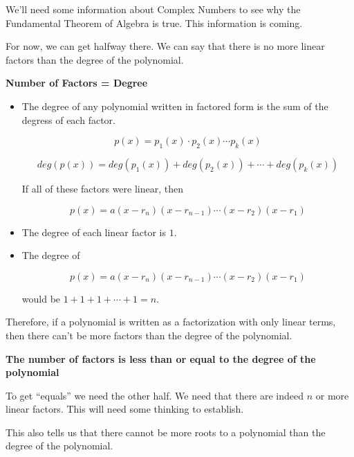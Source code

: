 \documentclass{ximera}
\begin{document}
We'll need some information about Complex Numbers to see why the Fundamental Theorem of Algebra is true. This information is coming. 

For now, we can get halfway there. We can say that there is no more linear factors than the degree of the polynomial.



\begin{idea} \textbf{\textcolor{blue!55!black}{Number of Factors = Degree}}  \\


\begin{itemize}
\item The degree of any polynomial written in factored form is the sum of the degress of each factor.

\[
 p(x) = p_1(x) \cdot p_2(x) \cdots p_k(x)
\]

\[
deg(p(x)) = deg(p_1(x)) + deg(p_2(x)) + \cdots + deg(p_k(x))
\]

If all of these factors were linear, then 

\[
 p(x) = a (x - r_n) (x - r_{n-1}) \cdots (x - r_2)  (x - r_1) 
\]

\item The degree of each linear factor is $1$. \\

\item The degree of 

\[
p(x) = a (x - r_n) (x - r_{n-1}) \cdots (x - r_2)  (x - r_1) 
\]

would be $1 + 1 + 1 + \cdots + 1 = n$.
\end{itemize}



Therefore, if a polynomial is written as a factorization with only linear terms, then there can't be more factors than the degree of the polynomial. \\

\begin{center}
\textbf{The number of factors is less than or equal to the degree of the polynomial}
\end{center}



To get ``equals'' we need the other half.  We need that there are indeed $n$ or more linear factors.  This will need some thinking to establish.

\end{idea}

This also tells us that there cannot be more roots to a polynomial than the degree of the polynomial. \\
\end{document}
